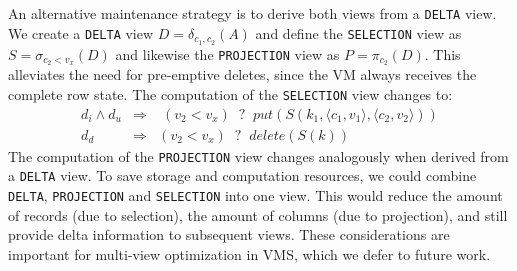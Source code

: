 An alternative maintenance strategy is to derive both views from a
\texttt{DELTA} view. We create a \texttt{DELTA} view
$D=\delta_{c_1,c_2}(A)$ and define the \texttt{SELECTION} view as
$S=\sigma_{c_2 < v_x}(D)$ and likewise the \texttt{PROJECTION} view as
$P=\pi_{c_2}(D)$. This alleviates the need for pre-emptive deletes,
since the VM always receives the complete row state. The computation
of the \texttt{SELECTION} view changes to:
%
\begin{eqnarray}
	d_i \land d_u & \Rightarrow & \;(v_2 < v_x)\;\; \texttt{?} \;\;put(S(k_1,\langle c_1,v_1\rangle, \langle c_2,v_2\rangle))\\
	d_d                & \Rightarrow & (v_2 < v_x)\;\; \texttt{?} \;\;delete(S(k))
\end{eqnarray}
%
The computation of the \texttt{PROJECTION} view changes analogously
when derived from a \texttt{DELTA} view. To save storage and
computation resources, we could combine \texttt{DELTA},
\texttt{PROJECTION} and \texttt{SELECTION} into one view. This would
reduce the amount of records (due to selection), the amount of columns
(due to projection), and still provide delta information to subsequent
views. These considerations are important for multi-view optimization
in VMS, which we defer to future work.


